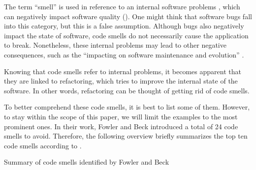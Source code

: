 The term “smell” is used in reference to an internal software problems
	\textcite[p.~2]{lacerda2020}, 
	which can negatively impact software quality 
	(\cite[p.~1]{sonnleithner2021}). 
One might think that software bugs fall into this category, 
	but this is a false assumption.
Although bugs also negatively impact the state of software, 
	code smells do not necessarily cause the application to break.
Nonetheless, these internal problems may lead to other negative consequences,
	such as the “impacting on software maintenance and evolution”
	\cite[p.~2]{lacerda2020}.
 

Knowing that code smells refer to internal problems,
	it becomes apparent that they are linked to refactoring, 
	which tries to improve the internal state of the software.
In other words, 
	refactoring can be thought of getting rid of code smells. 

To better comprehend these code smells, it is best to list some of them. 
However, to stay within the scope of this paper, 
	we will limit the examples to the most prominent ones. 
In their work, Fowler and Beck introduced a total of 24 code smells to avoid.
Therefore, 
	the following overview briefly summarizes 
	the top ten code smells according to 
	\textcite{lacerda2020}.

Summary of code smells identified by Fowler and Beck \textcite{fowler2018} 


